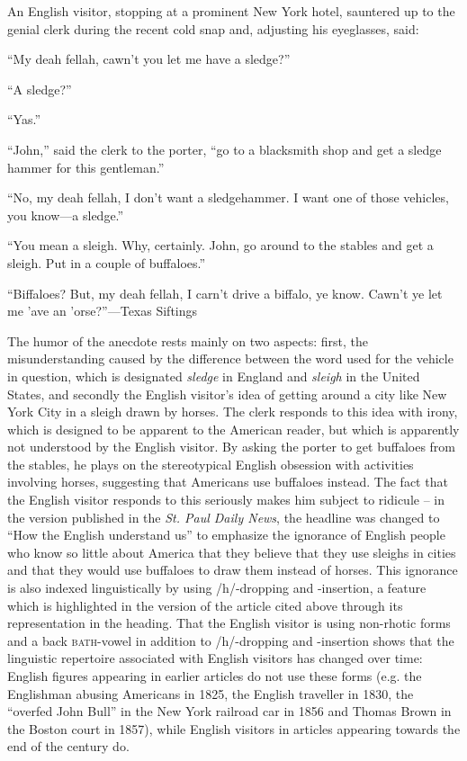 \begin{ipquote}
\begin{center}
\end{center}
An English visitor, stopping at a prominent New York hotel, sauntered up to the genial clerk during the recent cold snap and, adjusting his eyeglasses, said:

“My deah fellah, cawn’t you let me have a sledge?”

“A sledge?”

“Yas.”

“John,” said the clerk to the porter, “go to a blacksmith shop and get a sledge hammer for this gentleman.”

“No, my deah fellah, I don’t want a sledgehammer. I want one of those vehicles, you know—a sledge.”

“You mean a sleigh. Why, certainly. John, go around to the stables and get a sleigh. Put in a couple of buffalo{\kern0pt}es.”

“Biffalo{\kern0pt}es? But, my deah fellah, I carn’t drive a biffalo, ye know. Cawn’t ye let me ’ave an ’orse?”—Texas Siftings
\end{ipquote}


The humor of the anecdote rests mainly on two aspects: first, the misunderstanding caused by the difference between the word used for the vehicle in question, which is designated \emph{sledge} in England and \emph{sleigh} in the United States, and secondly the English visitor’s idea of getting around a city like New York City in a sleigh drawn by horses. The clerk responds to this idea with irony, which is designed to be apparent to the American reader, but which is apparently not understood by the English visitor. By asking the porter to get buffaloes from the stables, he plays on the stereotypical English obsession with activities involving horses, suggesting that Americans use buffaloes instead. The fact that the English visitor responds to this seriously makes him subject to ridicule – in the version published in the \emph{St. Paul Daily News}, the headline was changed to “How the English understand us” to emphasize the ignorance of English people who know so little about America that they believe that they use sleighs in cities and that they would use buffaloes to draw them instead of horses. This ignorance is also indexed linguistically by using /h/-dropping and -insertion, a feature which is highlighted in the version of the article cited above through its representation in the heading. That the English visitor is using non-rhotic forms and a back \textsc{bath}{}-vowel in addition to /h/-dropping and -insertion shows that the linguistic repertoire associated with English visitors has changed over time: English figures appearing in earlier articles do not use these forms (e.g. the Englishman abusing Americans in 1825, the English traveller in 1830, the “overfed John Bull” in the New York railroad car in 1856 and Thomas Brown in the Boston court in 1857), while English visitors in articles appearing towards the end of the century do.


